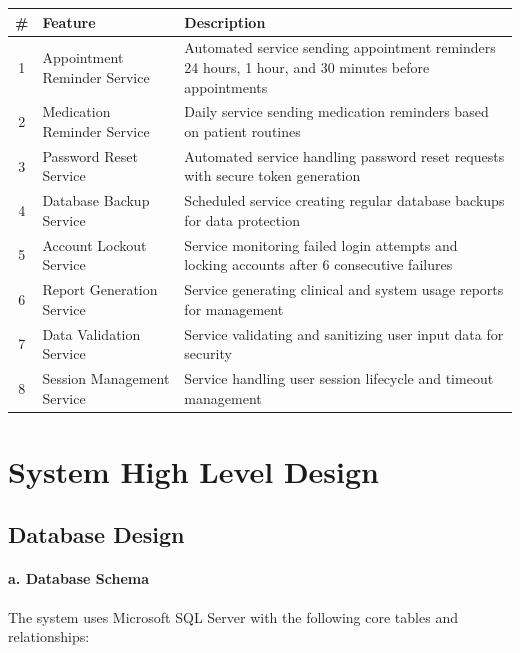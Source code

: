 \documentclass[12pt,a4paper]{article}
\begin{document}
\begin{longtable}{|c|p{4cm}|p{8cm}|}
\hline
\textbf{\#} & \textbf{Feature} & \textbf{Description} \\
\hline
1 & Appointment Reminder Service & Automated service sending appointment reminders 24 hours, 1 hour, and 30 minutes before appointments \\
\hline
2 & Medication Reminder Service & Daily service sending medication reminders based on patient routines \\
\hline
3 & Password Reset Service & Automated service handling password reset requests with secure token generation \\
\hline
4 & Database Backup Service & Scheduled service creating regular database backups for data protection \\
\hline
5 & Account Lockout Service & Service monitoring failed login attempts and locking accounts after 6 consecutive failures \\
\hline
6 & Report Generation Service & Service generating clinical and system usage reports for management \\
\hline
7 & Data Validation Service & Service validating and sanitizing user input data for security \\
\hline
8 & Session Management Service & Service handling user session lifecycle and timeout management \\
\hline
\end{longtable}

\section{System High Level Design}

\subsection{Database Design}

\paragraph{a. Database Schema}

The system uses Microsoft SQL Server with the following core tables and relationships:
\end{document}
